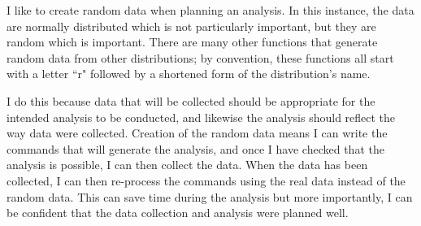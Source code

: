 I like to create random data when planning an analysis. In this instance, the data are normally distributed which is not particularly important, but they are random which is important. There are many other functions that generate random data from other distributions; by convention, these functions all start with a letter ``r" followed by a shortened form of the distribution's name.  
 
I do this because data that will  be collected should be appropriate for the intended analysis to be conducted, and likewise the analysis should reflect the way data were collected. Creation of the random data means I can write the \R{} commands that will generate the analysis, and once I have checked that the analysis is possible, I can then collect the data. When the data has been collected, I can then re-process the commands using the real data instead of the  random data. This can save time during the analysis but more importantly, I can be confident that the data collection and analysis were planned well. 
 
 



